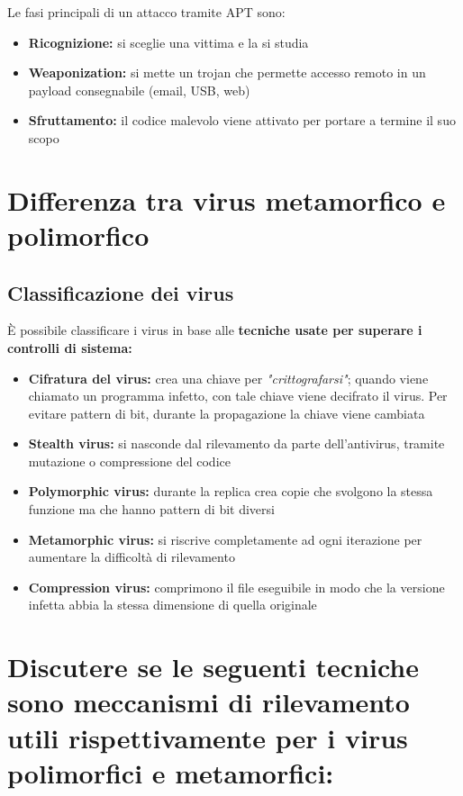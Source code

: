 \documentclass{report}
\begin{document}
\noindent Le fasi principali di un attacco tramite APT sono:
\begin{itemize}
    \item \textbf{Ricognizione:} si sceglie una vittima e la si studia 
    \item \textbf{Weaponization:} si mette un trojan che permette accesso remoto in un payload consegnabile (email, USB, web)
    \item \textbf{Sfruttamento:} il codice malevolo viene attivato per portare a termine il suo scopo
\end{itemize}



\section{Differenza tra virus metamorfico e polimorfico}
\subsection{Classificazione dei virus}
È possibile classificare i virus in base alle \textbf{tecniche usate per superare i controlli 
di sistema:}
\begin{itemize}
    \item \textbf{Cifratura del virus:} crea una chiave per \textit{"crittografarsi"}; quando viene 
    chiamato un programma infetto, con tale chiave viene decifrato il virus. Per evitare pattern 
    di bit, durante la propagazione la chiave viene cambiata
    \item \textbf{Stealth virus:} si nasconde dal rilevamento da parte dell'antivirus, tramite mutazione 
    o compressione del codice 
    \item \textbf{Polymorphic virus:} durante la replica crea copie che svolgono la stessa funzione 
    ma che hanno pattern di bit diversi 
    \item \textbf{Metamorphic virus:} si riscrive completamente ad ogni iterazione per aumentare la 
    difficoltà di rilevamento
    \item \textbf{Compression virus:} comprimono il file eseguibile in modo che la versione infetta 
    abbia la stessa dimensione di quella originale
\end{itemize} 

\section{Discutere se le seguenti tecniche sono meccanismi di rilevamento utili rispettivamente per i virus polimorfici e metamorfici:}
\end{document}
